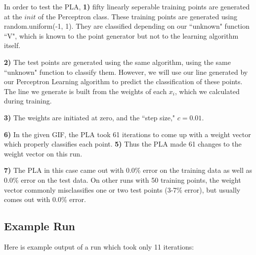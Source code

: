 \documentclass{article}
\begin{document}
In order to test the PLA, \textbf{1)} fifty linearly seperable training points are generated at the $init$ of the Perceptron class. 
These training points are generated using random.uniform(-1, 1). They are classified depending on our ``unknown" 
function ``V", which is known to the point generator but not to the learning algorithm itself. 

\textbf{2)} The test points are generated using the same algorithm, using the same ``unknown" function to classify them. However,
we will use our line generated by our Perceptron Learning algorithm to predict the classification of these points. The line we generate 
is built from the weights of each $x_i$, which we calculated during training.

\textbf{3)} The weights are initiated at zero, and the ``step size," $c = 0.01$.

\textbf{6)} In the given GIF, the PLA took 61 iterations to come up with a weight vector which properly classifies each point. \textbf{5)} Thus the 
PLA made 61 changes to the weight vector on this run.

\textbf{7)} The PLA in this case came out with 0.0\% error on the training data as well as 0.0\% error on the test data. On other runs with 50 training points, 
the weight vector commonly misclassifies one or two test points (3-7\% error), but usually comes out with 0.0\% error. \\

\subsection*{Example Run}
Here is example output of a run which took only 11 iterations:
\end{document}
